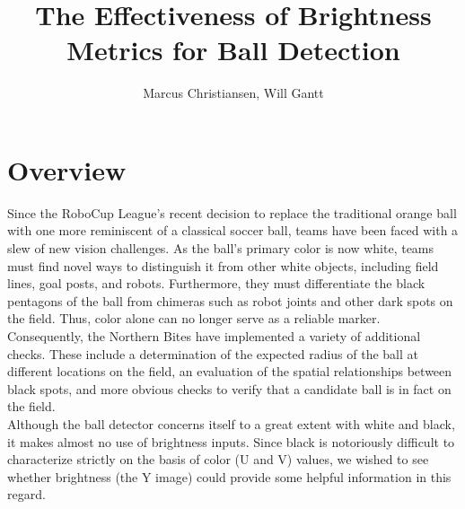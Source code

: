 \documentclass[11pt, twocolumn]{article}
\begin{document}
\title{The Effectiveness of Brightness Metrics for Ball Detection}
\author{Marcus Christiansen, Will Gantt}
\maketitle

\section{Overview}
Since the RoboCup League's recent decision to replace the traditional orange ball with one more reminiscent of a classical soccer ball, teams have been faced with a slew of new vision challenges. As the ball's primary color is now white, teams must find novel ways to distinguish it from other white objects, including field lines, goal posts, and robots. Furthermore, they must differentiate the black pentagons of the ball from chimeras such as robot joints and other dark spots on the field. Thus, color alone can no longer serve as a reliable marker. Consequently, the Northern Bites have implemented a variety of additional checks. These include a determination of the expected radius of the ball at different locations on the field, an evaluation of the spatial relationships between black spots, and more obvious checks to verify that a candidate ball is in fact on the field. \\
\indent Although the ball detector concerns itself to a great extent with white and black, it makes almost no use of brightness inputs. Since black is notoriously difficult to characterize strictly on the basis of color (U and V) values, we wished to see whether brightness (the Y image) could provide some helpful information in this regard. 
\end{document}
